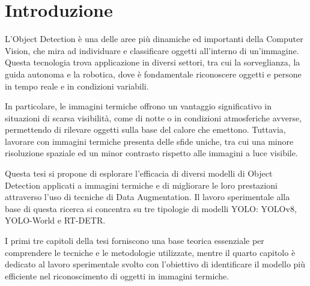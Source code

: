 \chapter{Introduzione}\label{ch:introduzione}

L'Object Detection è una delle aree più dinamiche ed importanti della Computer Vision, che mira ad individuare e classificare oggetti all'interno di un'immagine. Questa tecnologia trova applicazione in diversi settori, tra cui la sorveglianza, la guida autonoma e la robotica, dove è fondamentale riconoscere oggetti e persone in tempo reale e in condizioni variabili.

In particolare, le immagini termiche offrono un vantaggio significativo in situazioni di scarsa visibilità, come di notte o in condizioni atmosferiche avverse, permettendo di rilevare oggetti sulla base del calore che emettono. Tuttavia, lavorare con immagini termiche presenta delle sfide uniche, tra cui una minore risoluzione spaziale ed un minor contrasto rispetto alle immagini a luce visibile.

Questa tesi si propone di esplorare l'efficacia di diversi modelli di Object Detection applicati a immagini termiche e di migliorare le loro prestazioni attraverso l'uso di tecniche di Data Augmentation. Il lavoro sperimentale alla base di questa ricerca si concentra su tre tipologie di modelli YOLO: YOLOv8, YOLO-World e RT-DETR.

I primi tre capitoli della tesi forniscono una base teorica essenziale per comprendere le tecniche e le metodologie utilizzate, mentre il quarto capitolo è dedicato al lavoro sperimentale svolto con l'obiettivo di identificare il modello più efficiente nel riconoscimento di oggetti in immagini termiche.